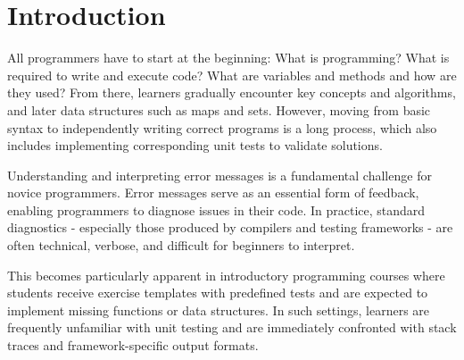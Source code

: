 \chapter{Introduction} %
\label{sec:intro-motivation}








\begin{justify}
All programmers have to start at the beginning: What is programming? What is required to write and execute code? What are variables and methods and how are they used?
From there, learners gradually encounter key concepts and algorithms, and later data structures such as maps and sets.
However, moving from basic syntax to independently writing correct programs is a long process, which also includes implementing corresponding unit tests to validate solutions.
\end{justify}

\begin{justify}
Understanding and interpreting error messages is a fundamental challenge for novice programmers.
Error messages serve as an essential form of feedback, enabling programmers to diagnose issues in their code.
In practice, standard diagnostics - especially those produced by compilers and testing frameworks - are often technical, verbose, and difficult for beginners to interpret.
\end{justify}

\begin{justify}
This becomes particularly apparent in introductory programming courses where students receive exercise templates with predefined tests and are expected to implement missing functions or data structures.
In such settings, learners are frequently unfamiliar with unit testing and are immediately confronted with stack traces and framework-specific output formats.
\end{justify}

